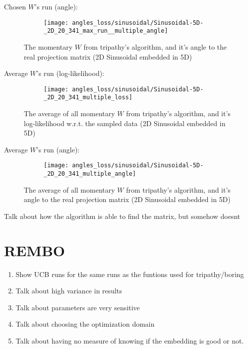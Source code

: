 Chosen $W$'s run (angle):
\begin{figure}[H]
    \centering
    \begin{subfigure}[b]{0.40\textwidth}
        \texttt{[image: angles\_loss/sinusoidal/Sinusoidal-5D-\_2D\_20\_341\_max\_run\_\_multiple\_angle]}
        \label{fig:gull}
    \end{subfigure}
           \caption{The momentary $W$ from tripathy's algorithm, and it's angle to the real projection matrix (2D Sinusoidal embedded in 5D)}
\end{figure}


Average $W$'s run (log-likelihood):
\begin{figure}[H]
    \centering
    \begin{subfigure}[b]{0.40\textwidth}
        \texttt{[image: angles\_loss/sinusoidal/Sinusoidal-5D-\_2D\_20\_341\_multiple\_loss]}
        \label{fig:gull}
    \end{subfigure}
           \caption{The average of all momentary $W$ from tripathy's algorithm, and it's log-likelihood w.r.t. the sampled data (2D Sinusoidal embedded in 5D)}
\end{figure}


Average $W$'s run (angle):
\begin{figure}[H]
    \centering
    \begin{subfigure}[b]{0.40\textwidth}
        \texttt{[image: angles\_loss/sinusoidal/Sinusoidal-5D-\_2D\_20\_341\_multiple\_angle]}
        \label{fig:gull}
    \end{subfigure}
           \caption{The average of all momentary $W$ from tripathy's algorithm, and it's angle to the real projection matrix (2D Sinusoidal embedded in 5D)}
\end{figure}

Talk about how the algorithm is able to find the matrix, but somehow doesnt


\section{REMBO}

\begin{enumerate}
\item Show UCB runs for the same runs as the funtions used for tripathy/boring
\item Talk about high variance in results
\item Talk about parameters are very sensitive
\item Talk about choosing the optimization domain
\item Talk about having no measure of knowing if the embedding is good or not.
\end{enumerate}




